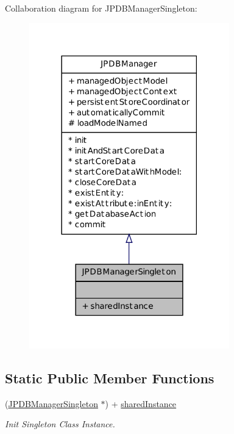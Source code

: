 Collaboration diagram for JPDBManagerSingleton:
\nopagebreak
\begin{figure}[H]
\begin{center}
\leavevmode
\includegraphics[width=246pt]{interface_j_p_d_b_manager_singleton__coll__graph}
\end{center}
\end{figure}
\subsection*{Static Public Member Functions}
\begin{DoxyCompactItemize}
\item 
(\hyperlink{interface_j_p_d_b_manager_singleton}{JPDBManagerSingleton} $\ast$) + \hyperlink{interface_j_p_d_b_manager_singleton_a505d4d641b1b0adc616c6aba8c11951c}{sharedInstance}
\begin{DoxyCompactList}\small\item\em Init Singleton Class Instance. \item\end{DoxyCompactList}\end{DoxyCompactItemize}


